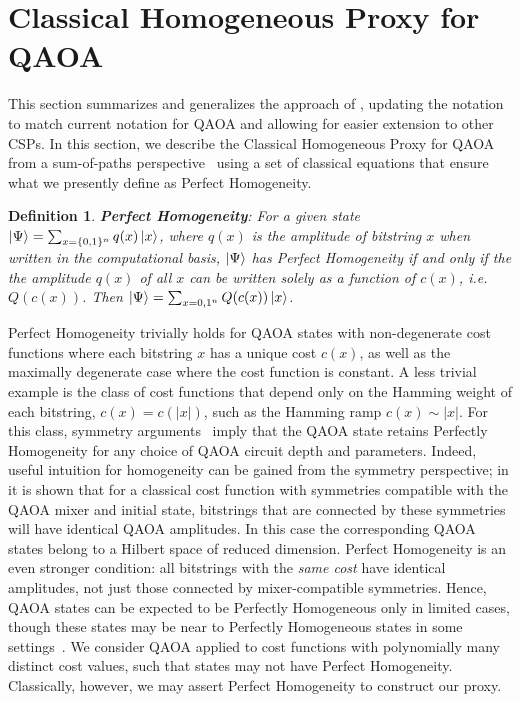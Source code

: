\documentclass[superscriptaddress,pra,aps,10pt,longbibliography,notitlepage]{revtex4-1}
\newtheorem{definition}{Definition}
\begin{document}
\section{Classical Homogeneous Proxy for QAOA}\label{homogeneous_approximation}

This section summarizes and generalizes the approach of \cite{hogg00}, updating the notation to match current notation for QAOA and allowing for easier extension to other CSPs. In this section, we describe  the Classical Homogeneous Proxy for QAOA from a sum-of-paths perspective~\cite{hogg00,hadfield2021analytical} using a set of classical equations that ensure what we presently define as Perfect Homogeneity.

\begin{definition}\label{def:perfect_homogeneity}
\textbf{Perfect Homogeneity}: For a given state $\ket{\Psi}=\sum_{x=\{0,1\}^n} q(x) \ket{x}$, where $q(x)$ is the amplitude of bitstring $x$ when written in the computational basis, $\ket{\Psi}$ has Perfect Homogeneity if and only if the the amplitude $q(x)$ of all $x$ can be written solely as a function of $c(x)$, i.e. $Q(c(x))$. Then $\ket{\Psi}=\sum_{x={0,1}^n} Q(c(x)) \ket{x}$.
\end{definition}

Perfect Homogeneity trivially holds for QAOA states with non-degenerate cost functions where each bitstring $x$ has a unique cost $c(x)$, as well as the maximally degenerate case where the cost function is constant. A less trivial example is the class of cost functions that depend only on the Hamming weight of each bitstring, $c(x)=c(|x|)$, such as the Hamming ramp $c(x) \sim |x|$. For this class, symmetry arguments~\cite{shaydulin21_symmetries} imply that the QAOA state retains Perfectly Homogeneity for any choice of QAOA circuit depth and parameters. Indeed, useful intuition for homogeneity can be gained from the symmetry perspective; in \cite[Lem. 1]{shaydulin21_symmetries} it is shown that for a classical cost function with symmetries compatible with the QAOA mixer and initial state, bitstrings that are connected by these symmetries will have identical QAOA amplitudes. In this case the corresponding QAOA states belong to a Hilbert space of reduced dimension. Perfect Homogeneity is an even stronger condition: all bitstrings with the \emph{same cost} have identical amplitudes, not just those connected by mixer-compatible symmetries. Hence, QAOA states can be expected to be Perfectly Homogeneous only in limited cases, though these states may be near to Perfectly Homogeneous states in some settings~\cite{hogg00}. We consider QAOA applied to cost functions with polynomially many distinct cost values, such that states may not have Perfect Homogeneity. Classically, however, we may assert Perfect Homogeneity to construct our proxy. 
\end{document}
